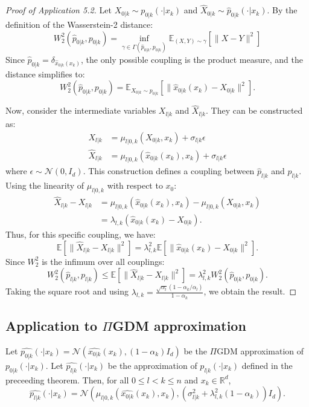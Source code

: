 \documentclass[12pt]{article}
\begin{document}
\begin{proof}[Proof of Application 5.2]
Let $X_{0|k} \sim p_{0|k}(\cdot | x_k)$ and $\hat{X}_{0|k} \sim \hat{p}_{0|k}(\cdot | x_k)$. 
By the definition of the Wasserstein-2 distance:
$$W_2^2(\hat{p}_{0|k}, p_{0|k}) = \inf_{\gamma \in \Gamma(\hat{p}_{0|k}, p_{0|k})} \mathbb{E}_{ (X,Y) \sim \gamma} [\| X - Y \|^2]$$
Since $\hat{p}_{0|k} = \delta_{\hat{x}_{0|k}(x_k)}$, the only possible coupling is the product measure, and the distance simplifies to:
$$W_2^2(\hat{p}_{0|k}, p_{0|k}) = \mathbb{E}_{X_{0|k} \sim p_{0|k}} [\| \hat{x}_{0|k}(x_k) - X_{0|k} \|^2].$$

Now, consider the intermediate variables $X_{l|k}$ and $\hat{X}_{l|k}$. They can be constructed as:
\begin{align*}
    X_{l|k} &= \mu_{l|0,k}(X_{0|k}, x_k) + \sigma_{l|k} \epsilon \\
    \hat{X}_{l|k} &= \mu_{l|0,k}(\hat{x}_{0|k}(x_k), x_k) + \sigma_{l|k} \epsilon
\end{align*}
where $\epsilon \sim \mathcal{N}(0, I_d)$. This construction defines a coupling between $\hat{p}_{l|k}$ and $p_{l|k}$. Using the linearity of $\mu_{l|0,k}$ with respect to $x_0$:
\begin{align*}
    \hat{X}_{l|k} - X_{l|k} &= \mu_{l|0,k}(\hat{x}_{0|k}(x_k), x_k) - \mu_{l|0,k}(X_{0|k}, x_k) \\
    &= \lambda_{l,k} (\hat{x}_{0|k}(x_k) - X_{0|k}).
\end{align*}
Thus, for this specific coupling, we have:
$$\mathbb{E} [\| \hat{X}_{l|k} - X_{l|k} \|^2] = \lambda_{l,k}^2 \mathbb{E} [\| \hat{x}_{0|k}(x_k) - X_{0|k} \|^2].$$
Since $W_2^2$ is the infimum over all couplings:
$$W_2^2(\hat{p}_{l|k}, p_{l|k}) \leq \mathbb{E} [\| \hat{X}_{l|k} - X_{l|k} \|^2] = \lambda_{l,k}^2 W_2^2(\hat{p}_{0|k}, p_{0|k}).$$
Taking the square root and using $\lambda_{l,k} = \frac{\sqrt{\alpha_l}(1 - \alpha_k/\alpha_l)}{1 - \alpha_k}$, we obtain the result.
\end{proof}

\subsection{Application to $\Pi$GDM approximation}

\begin{application}
    Let $\hat{p_{0|k}}(\cdot | x_k) = \mathcal{N}(\hat{x_{0|k}}(x_k), (1 - \alpha_k) I_d)$ 
    be the $\Pi$GDM approximation of $p_{0|k}(\cdot | x_k)$.
    Let $\hat{p_{l|k}}(\cdot | x_k)$ be the approximation of $p_{l|k}(\cdot | x_k)$ defined in the preceeding theorem.
    Then, for all $0 \leq l < k \leq n$ and $x_k \in \mathbb{R}^d$,
    $$\hat{p_{l|k}}(\cdot | x_k)  = 
    \mathcal{N}\left(\mu_{l|0,k}(\hat{x_{0|k}}(x_k), x_k), (\sigma_{l|k}^2 + \lambda_{l,k}^2(1-\alpha_k) )I_d \right).$$
\end{application}
\end{document}
